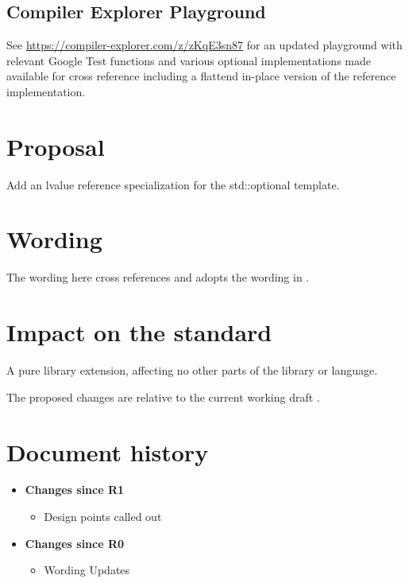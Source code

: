 \documentclass[a4paper,10pt,oneside,openany,final,article]{memoir}
\begin{document}
\section{Compiler Explorer Playground}

See \url{https://compiler-explorer.com/z/zKqE3sn87} for an updated playground with relevant Google Test functions and various optional implementations made available for cross reference including a flattend in-place version of the reference implementation.

\chapter{Proposal}

Add an lvalue reference specialization for the std::optional template.

\chapter{Wording}

The wording here cross references and adopts the wording in \cite{P3091R2}.


\begin{wording}



\end{wording}

\chapter{Impact on the standard}

A pure library extension, affecting no other parts of the library or language.

The proposed changes are relative to the current working draft \cite{N4910}.

\chapter*{Document history}

\begin{itemize}
\item \textbf{Changes since R1}
  \begin{itemize}
  \item Design points called out
  \end{itemize}
\item \textbf{Changes since R0}
  \begin{itemize}
  \item Wording Updates
  \end{itemize}
\end{itemize}
\end{document}
